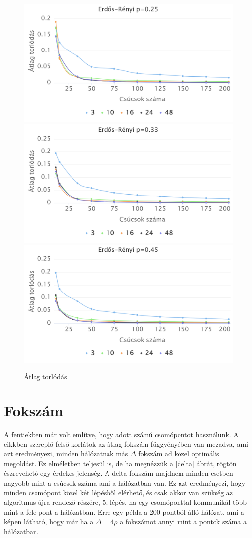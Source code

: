 \documentclass[12pt]{report}
\begin{document}
\begin{figure}[h]
	\begin{center}
		\includegraphics[width=0.40\linewidth]{pictures/constant_dan_ratio25_congestion.png}
		\includegraphics[width=0.40\linewidth]{pictures/constant_dan_ratio33_congestion.png}
		\includegraphics[width=0.40\linewidth]{pictures/constant_dan_ratio45_congestion.png}
		\caption{Átlag torlódás}
		\label{congestion}
	\end{center}
\end{figure}

\section{Fokszám}

A fentiekben már volt említve, hogy adott számú csomópontot használunk.
A cikkben szereplő felső korlátok az átlag fokszám függvényében van megadva, ami azt eredményezi, minden hálózatnak más $\Delta$ fokszám ad közel optimális megoldást.
Ez elméletben teljesül is, de ha megnézzük a \ref{delta} ábrát, rögtön észrevehető egy érdekes jelenség. 
A delta fokszám majdnem minden esetben nagyobb mint a csúcsok száma ami a hálózatban van.
Ez azt eredményezi, hogy minden csomópont közel két lépésből elérhető, és csak akkor van szükség az algoritmus újra rendező részére, 5. lépés, ha egy csomóponttal kommunikál több mint a fele pont a hálózatban.
Erre egy példa a 200 pontból álló hálózat, ami a képen látható, hogy már ha a $\Delta=4\rho$ a fokszámot annyi mint a pontok száma a hálózatban.
\end{document}
